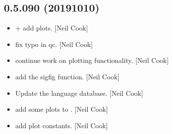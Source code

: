 \documentclass[a4paper,10pt,english]{report}
\begin{document}
\subsection{0.5.090 (2019\sphinxhyphen{}10\sphinxhyphen{}10)}
\label{\detokenize{misc/changelog:id72}}\begin{itemize}
\item {} 
 +  \sphinxhyphen{}
add plots. {[}Neil Cook{]}

\item {} 
 \sphinxhyphen{} fix typo in qc. {[}Neil Cook{]}

\item {} 
 \sphinxhyphen{} continue work on plotting functionality. {[}Neil Cook{]}

\item {} 
 \sphinxhyphen{} add the sigfig function. {[}Neil Cook{]}

\item {} 
Update the language database. {[}Neil Cook{]}

\item {} 
 \sphinxhyphen{} add some plots to
. {[}Neil Cook{]}

\item {} 
 \sphinxhyphen{} add plot constants. {[}Neil
Cook{]}

\end{itemize}
\end{document}
